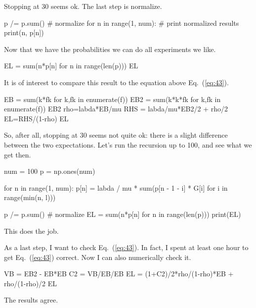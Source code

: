 \begin{exercise}
\begin{solution}
\begin{pyconsole}
\end{pyconsole}
Stopping at 30 seems ok. The last step is normalize.
\begin{pyconsole}
p /= p.sum()  # normalize
for n in range(1, num):  # print normalized results
    print(n, p[n])

\end{pyconsole}

Now that we have the probabilities we can do all experiments we like. 
\begin{pyconsole}
EL = sum(n*p[n] for n in range(len(p)))
EL 
\end{pyconsole}

It is of interest to compare this result to the equation above
Eq.~(\ref{eq:43}).


\begin{pyconsole}
EB = sum(k*fk for k,fk in enumerate(f))
EB2 = sum(k*k*fk for k,fk in enumerate(f))
EB2
rho=labda*EB/mu
RHS = labda/mu*EB2/2 + rho/2
EL=RHS/(1-rho)
EL
\end{pyconsole}

So, after all, stopping at 30 seems not quite ok: there is a slight
difference between the two expectations. Let's run the recursion up to
100, and see what we get then.

\begin{pyconsole}
num = 100
p = np.ones(num)

for n in range(1, num):
    p[n] = labda / mu * sum(p[n - 1 - i] * G[i] for i in range(min(n, l)))

p /= p.sum()  # normalize
EL = sum(n*p[n] for n in range(len(p)))
print(EL)
\end{pyconsole}
This does the job.

As a last step, I want to check Eq.~(\ref{eq:43}). In fact, I spent at least one hour to
get Eq.~(\ref{eq:43}) correct. Now I can also numerically check it.

\begin{pyconsole}
VB = EB2 - EB*EB
C2 = VB/EB/EB
EL = (1+C2)/2*rho/(1-rho)*EB + rho/(1-rho)/2
EL
\end{pyconsole}
The results agree. 
\end{solution}
\end{exercise}


